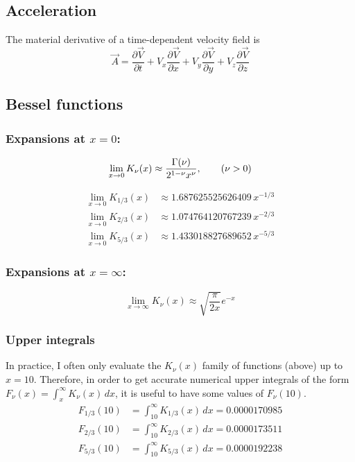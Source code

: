\documentclass{article}
\newcommand{\pd}[2]{\frac{\partial {#1}}{\partial {#2}}}
\begin{document}
\subsection{Acceleration}

The material derivative of a time-dependent velocity field is
\begin{equation}
    \vec{A} = \pd{\vec{V}}{t} + V_x\pd{\vec{V}}{x} + V_y\pd{\vec{V}}{y} + V_z\pd{\vec{V}}{z}
\end{equation}

\subsection{Bessel functions}

\subsubsection{Expansions at $x=0$:}

\begin{equation}
    \lim_{x\rightarrow0} K_\nu(x)
        \approx \frac{\Gamma(\nu)}{2^{1-\nu}x^\nu}, \qquad (\nu > 0) \\
\end{equation}

\begin{align}
    \lim_{x\rightarrow0} K_{1/3}(x)
        &\approx 1.687625525626409\,x^{-1/3} \\
    \lim_{x\rightarrow0} K_{2/3}(x)
        &\approx 1.074764120767239\,x^{-2/3} \\
    \lim_{x\rightarrow0} K_{5/3}(x)
        &\approx 1.433018827689652\,x^{-5/3}
\end{align}

\subsubsection{Expansions at $x=\infty$:}

\begin{equation}
    \lim_{x\rightarrow\infty} K_\nu(x)
        \approx \sqrt{\frac{\pi}{2x}}e^{-x}
\end{equation}

\subsubsection{Upper integrals}

In practice, I often only evaluate the $K_\nu(x)$ family of functions (above) up to $x = 10$.
Therefore, in order to get accurate numerical upper integrals of the form $F_\nu(x) = \int_x^\infty K_\nu(x)\,dx$, it is useful to have some values of $F_\nu(10)$.
\begin{align}
    F_{1/3}(10) &= \int_{10}^\infty K_{1/3}(x)\,dx = 0.0000170985 \\
    F_{2/3}(10) &= \int_{10}^\infty K_{2/3}(x)\,dx = 0.0000173511 \\
    F_{5/3}(10) &= \int_{10}^\infty K_{5/3}(x)\,dx = 0.0000192238
\end{align}
\end{document}
